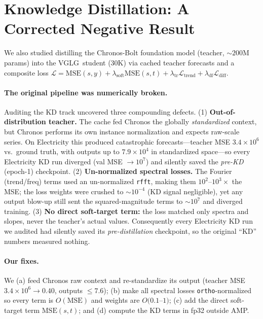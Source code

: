 \documentclass[11pt]{article}
\newcommand{\vglg}{\textsc{VGLG}}
\begin{document}
\section{Knowledge Distillation: A Corrected Negative Result}
\label{sec:kd}

We also studied distilling the Chronos-Bolt foundation model (teacher,
$\sim\!200$M params) into the \vglg\ student ($30$K) via cached teacher forecasts
and a composite loss
$\mathcal{L}=\mathrm{MSE}(s,y)+\lambda_{\mathrm{soft}}\mathrm{MSE}(s,t)
+\lambda_{\mathrm{tr}}\mathcal{L}_{\mathrm{trend}}+\lambda_{\mathrm{df}}\mathcal{L}_{\mathrm{diff}}$.

\paragraph{The original pipeline was numerically broken.} Auditing the KD track
uncovered three compounding defects. (1) \textbf{Out-of-distribution teacher.}
The cache fed Chronos the globally \emph{standardized} context, but Chronos
performs its own instance normalization and expects raw-scale series. On
Electricity this produced catastrophic forecasts---teacher MSE
$3.4\times10^{6}$ vs.\ ground truth, with outputs up to $7.9\times10^{4}$ in
standardized space---so every Electricity KD run diverged
(val MSE $\to10^{7}$) and silently saved the \emph{pre-KD} (epoch-1) checkpoint.
(2) \textbf{Un-normalized spectral losses.} The Fourier (trend/freq) terms used
an un-normalized \texttt{rfft}, making them $10^{2}$--$10^{3}\times$ the MSE; the
loss weights were crushed to $\sim\!10^{-4}$ (KD signal negligible), yet any
output blow-up still sent the squared-magnitude terms to $\sim\!10^{7}$ and
diverged training. (3) \textbf{No direct soft-target term:} the loss matched only
spectra and slopes, never the teacher's actual values. Consequently every
Electricity KD run we audited had silently saved its \emph{pre-distillation}
checkpoint, so the original ``KD'' numbers measured nothing.

\paragraph{Our fixes.} We (a) feed Chronos raw context and re-standardize its
output (teacher MSE $3.4\times10^{6}\!\to\!0.40$, outputs $\le7.6$); (b) make all
spectral losses \texttt{ortho}-normalized so every term is $O(\mathrm{MSE})$ and
weights are $O(0.1$--$1)$; (c) add the direct soft-target term $\mathrm{MSE}(s,t)$;
and (d) compute the KD terms in fp32 outside AMP.
\end{document}
